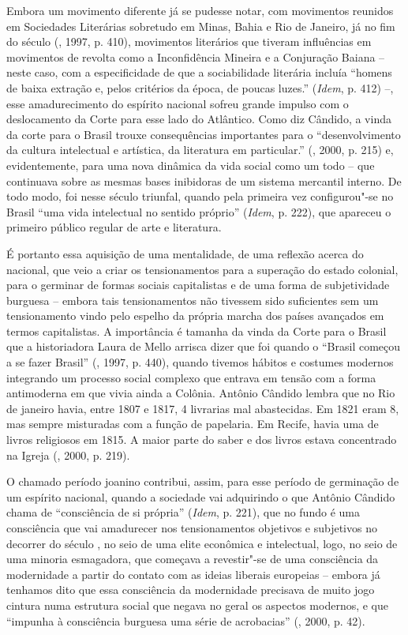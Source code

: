 Embora um movimento diferente já se pudesse notar, com movimentos
reunidos em Sociedades Literárias sobretudo em Minas, Bahia e Rio de
Janeiro, já no fim do século  (, 1997, p. 410), movimentos
literários que tiveram influências em movimentos de revolta como a
Inconfidência Mineira e a Conjuração Baiana -- neste caso, com a
especificidade de que a sociabilidade literária incluía ``homens de
baixa extração e, pelos critérios da época, de poucas luzes.''
(\emph{Idem}, p. 412) --, esse amadurecimento do espírito nacional
sofreu grande impulso com o deslocamento da Corte para esse lado do
Atlântico. Como diz Cândido, a vinda da corte para o Brasil trouxe
consequências importantes para o ``desenvolvimento da cultura
intelectual e artística, da literatura em particular.'' (, 2000,
p. 215) e, evidentemente, para uma nova dinâmica da vida social como um
todo -- que continuava sobre as mesmas bases inibidoras de um sistema
mercantil interno. De todo modo, foi nesse século triunfal, quando pela
primeira vez configurou"-se no Brasil ``uma vida intelectual no sentido
próprio'' (\emph{Idem}, p. 222), que apareceu o primeiro público regular
de arte e literatura.

É portanto essa aquisição de uma mentalidade, de uma reflexão acerca do
nacional, que veio a criar os tensionamentos para a superação do estado
colonial, para o germinar de formas sociais capitalistas e de uma forma
de subjetividade burguesa -- embora tais tensionamentos não tivessem
sido suficientes sem um tensionamento vindo pelo espelho da própria
marcha dos países avançados em termos capitalistas. A importância é
tamanha da vinda da Corte para o Brasil que a historiadora Laura de
Mello arrisca dizer que foi quando o ``Brasil começou a se fazer
Brasil'' (, 1997, p. 440), quando tivemos hábitos e costumes
modernos integrando um processo social complexo que entrava em tensão
com a forma antimoderna em que vivia ainda a Colônia. Antônio Cândido
lembra que no Rio de janeiro havia, entre 1807 e 1817, 4 livrarias mal
abastecidas. Em 1821 eram 8, mas sempre misturadas com a função de
papelaria. Em Recife, havia uma de livros religiosos em 1815. A maior
parte do saber e dos livros estava concentrado na Igreja (, 2000,
p. 219).

O chamado período joanino contribui, assim, para esse período de
germinação de um espírito nacional, quando a sociedade vai adquirindo o
que Antônio Cândido chama de ``consciência de si própria'' (\emph{Idem},
p. 221), que no fundo é uma consciência que vai amadurecer nos
tensionamentos objetivos e subjetivos no decorrer do século , no seio
de uma elite econômica e intelectual, logo, no seio de uma minoria
esmagadora, que começava a revestir"-se de uma consciência da modernidade
a partir do contato com as ideias liberais europeias -- embora já
tenhamos dito que essa consciência da modernidade precisava de muito
jogo cintura numa estrutura social que negava no geral os aspectos
modernos, e que ``impunha à consciência burguesa uma série de
acrobacias'' (, 2000, p. 42).

